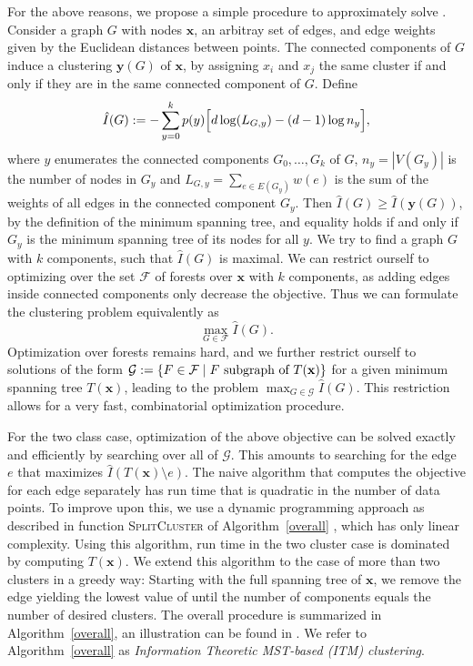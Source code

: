 For the above reasons, we propose a simple procedure to approximately solve
.
Consider a graph $G$ with nodes $\mathbf{x}$, an arbitray set of edges, and edge weights given by the
Euclidean distances between points.  The connected components of $G$ induce a
clustering $\mathbf{y}(G)$ of $\mathbf{x}$, by assigning $x_i$ and $x_j$ the
same cluster if and only if they are in the same connected component of $G$.
Define
\begin{align}\label{eq:graphobjective}
\hat{I}(G) := - \sum_{y=0}^k p(y) \Bigl[ d \log(L_{G,y}) - (d-1) \log{n_y} \Bigr],
\end{align}
where $y$ enumerates the connected components $G_0, \dotsc, G_k$ of $G$, $n_y =
|V(G_y)|$ is the number of nodes in $G_y$ and $L_{G,y} = \sum_{e \in E(G_y)}
w(e)$ is the sum of the weights of all edges in the connected component $G_y$.
%
Then $\hat{I}(G) \geq \hat{I}(\mathbf{y}(G))$, by the definition of
the minimum spanning tree, and equality holds if and only if $G_y$ is the
minimum spanning tree of its nodes for all $y$.
%
We try to find a graph $G$ with $k$ components, such that $\hat{I}(G)$ is maximal. We can restrict
ourself to optimizing over the set $\mathcal{F}$ of forests over $\mathbf{x}$ with $k$ components,
as adding edges inside connected components only decrease the objective.
Thus we can formulate the clustering problem equivalently as
\begin{equation}
    \max_{G \in \mathcal{F}} \hat{I}(G).
\end{equation}
Optimization over forests remains hard, and we further restrict ourself to
solutions of the form $\mathcal{G} := \{ F \in \mathcal{F} \mid F \text{\ subgraph of\
} T(\mathbf{x}) \}$ for a given minimum spanning tree $T(\mathbf{x})$, leading to
the problem $\displaystyle \max_{G \in \mathcal{G}} \hat{I}(G)$.  This restriction allows for
a very fast, combinatorial optimization procedure.


For the two class case, optimization of the above objective can be solved
exactly and efficiently by searching over all of $\mathcal{G}$.
This amounts to searching for the edge $e$ that maximizes $\hat{I}(T(\mathbf{x})
\setminus e)$. The naive algorithm that computes the objective for each edge
separately has run time that is quadratic in the number of data points.  To
improve upon this, we use a dynamic programming approach as described in
function \textsc{SplitCluster} of Algorithm~\ref{overall} , which has only linear
complexity. Using this algorithm, run time in the two cluster case is dominated
by computing $T(\mathbf{x})$.
%
We extend this algorithm to the case of more than two clusters in a greedy way:
Starting with the full spanning tree of $\mathbf{x}$, we remove the edge
yielding the lowest value of \Eqref{graphobjective} until the number of
components equals the number of desired clusters. The overall procedure is
summarized in Algorithm~\ref{overall}, an illustration can be found in
\Figref{illustration}. We refer to Algorithm~\ref{overall} as \emph{Information
Theoretic MST-based (ITM) clustering}.

